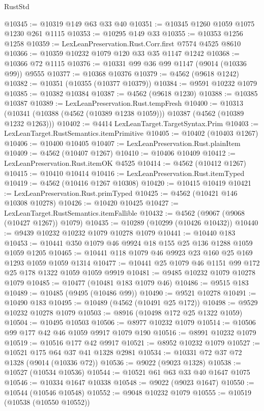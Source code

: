 \begin{lexlean}{RustStd}
\begin{coremodule}
@10345 := @10319 @149 @63 @33 @40
@10351 := @10345 @1260 @1059 @1075 @1230 @261 @1115
@10353 := @10295 @149 @33
@10355 := @10353 @1256 @1258
@10359 := LexLeanPreservation.Rust.Corr.first @7574 @4525 @8610
@10366 := @10359 @10232 @1079 @120 @33 @35 @1147 @1242
@10368 := @10366 @72 @1115
@10376 := @10331 @99 @36 @99 @1147 (@9014 (@10336 @99)) @9555
@10377 := @10368 @10376
@10379 := @4562 (@9618 @1242)
@10382 := @10351 (@10355 (@10377 @10379))
@10384 := @9591 @10232 @1079
@10385 := @10382 @10384
@10387 := @4562 (@9618 @1230)
@10388 := @10385 @10387
@10389 := LexLeanPreservation.Rust.tempFresh
@10400 := @10313 (@10341 (@10388 (@4562 (@10389 @1238 @1059))) @10387 (@4562 (@10389 @1232 @1263)))
@10402 := @4414 LexLeanTarget.TargetSyntax.Prim
@10403 := LexLeanTarget.RustSemantics.itemPrimitive
@10405 := @10402 (@10403 @1267)
@10406 := @10400 @10405
@10407 := LexLeanPreservation.Rust.plainItem
@10409 := @4562 (@10407 @1267)
@10410 := @10406 @10409
@10412 := LexLeanPreservation.Rust.itemOK @4525
@10414 := @4562 (@10412 @1267)
@10415 := @10410 @10414
@10416 := LexLeanPreservation.Rust.itemTyped
@10419 := @4562 (@10416 @1267 @10308)
@10420 := @10415 @10419
@10421 := LexLeanPreservation.Rust.primTyped
@10425 := @4562 (@10421 @146 @10308 @10278)
@10426 := @10420 @10425
@10427 := LexLeanTarget.RustSemantics.itemFallible
@10432 := @4562 (@9067 (@9068 (@10427 @1267)) @1079)
@10435 := @10289 (@10299 (@10426 @10432))
@10440 := @9439 @10232 @10232 @1079 @10278 @1079
@10441 := @10440 @183
@10453 := @10441 @350 @1079 @46 @9924 @18 @155 @25 @136 @1288 @1059 @1059 @1205
@10465 := @10441 @118 @1079 @46 @9923 @23 @160 @25 @169 @1293 @1059 @1059 @1314
@10477 := @10441 @25 @1079 @46 @1151 @99 @172 @25 @178 @1322 @1059 @1059 @9919
@10481 := @9485 @10232 @1079 @10278 @1079
@10485 := @10477 (@10481 @183 @1079 @46)
@10486 := @9515 @183
@10489 := @10485 (@9495 (@10486 @99))
@10490 := @9521 @10278
@10491 := @10490 @183
@10495 := @10489 (@4562 (@10491 @25 @172))
@10498 := @9529 @10232 @10278 @1079
@10503 := @8916 (@10498 @172 @25 @1322 @1059)
@10504 := @10495 @10503
@10506 := @8977 @10232 @1079
@10514 := @10506 @99 @177 @42 @46 @1059 @9917 @1079 @190
@10516 := @8991 @10232 @1079
@10519 := @10516 @177 @42 @9917
@10521 := @8952 @10232 @1079
@10527 := @10521 @175 @64 @37 @41 @1328 @2981
@10534 := @10331 @72 @37 @72 @1328 (@9014 (@10336 @72))
@10536 := @9022 (@9023 @1328)
@10538 := @10527 (@10534 @10536)
@10544 := @10521 @61 @63 @33 @40 @1647 @1075
@10546 := @10334 @1647 @10338
@10548 := @9022 (@9023 @1647)
@10550 := @10544 (@10546 @10548)
@10552 := @9048 @10232 @1079
@10555 := @10519 (@10538 (@10550 @10552))

\end{coremodule}
\end{lexlean}

